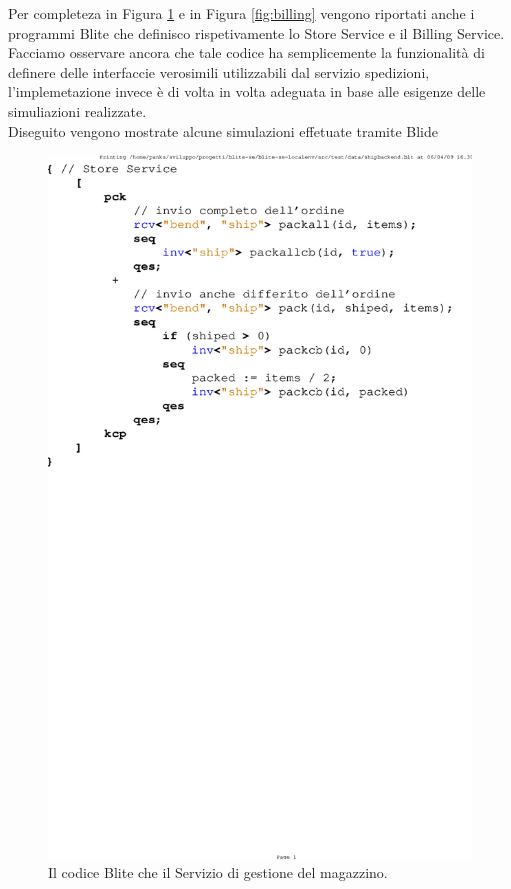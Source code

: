 Per completeza in Figura \ref{fig:store} e in Figura \ref{fig:billing} vengono
riportati anche i programmi Blite che definisco rispetivamente lo Store Service e il Billing
Service. Facciamo osservare ancora che tale codice ha semplicemente la
funzionalità di definere delle interfaccie verosimili utilizzabili dal servizio
spedizioni, l'implemetazione invece è di volta in volta adeguata in base alle
esigenze delle simuliazioni realizzate.
\\

Diseguito vengono mostrate alcune simulazioni effetuate tramite Blide

\begin{figure}[t!]
\begin{center}
  \includegraphics[scale=0.80,clip]{blide/dia/store}
   \caption[Codice Blite, interfaccia Store Service]{Il codice Blite che
   il Servizio di gestione del magazzino.}
  \label{fig:store}
\end{center}
\end{figure}

